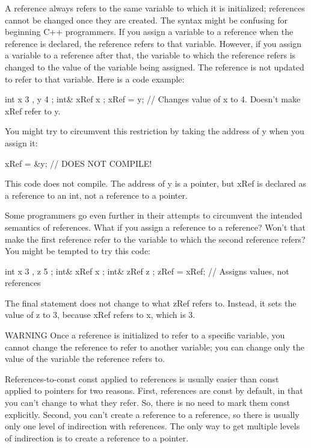 
A reference always refers to the same variable to which it is initialized; references cannot be changed once they are created. The syntax might be confusing for beginning C++ programmers. If you assign a variable to a reference when the reference is declared, the reference refers to that variable. However, if you assign a variable to a reference after that, the variable to which the reference refers is changed to the value of the variable being assigned. The reference is not updated to refer to that variable. Here is a code example:

\begin{cpp}
int x { 3 }, y { 4 };
int& xRef { x };
xRef = y; // Changes value of x to 4. Doesn't make xRef refer to y.
\end{cpp}

You might try to circumvent this restriction by taking the address of y when you assign it:

\begin{cpp}
xRef = &y; // DOES NOT COMPILE!
\end{cpp}

This code does not compile. The address of y is a pointer, but xRef is declared as a reference to an int, not a reference to a pointer.

Some programmers go even further in their attempts to circumvent the intended semantics of references. What if you assign a reference to a reference? Won’t that make the first reference refer to the variable to which the second reference refers? You might be tempted to try this code:

\begin{cpp}
int x { 3 }, z { 5 };
int& xRef { x };
int& zRef { z };
zRef = xRef; // Assigns values, not references
\end{cpp}

The final statement does not change to what zRef refers to. Instead, it sets the value of z to 3, because xRef refers to x, which is 3.

\begin{myWarning}{WARNING}
Once a reference is initialized to refer to a specific variable, you cannot change the reference to refer to another variable; you can change only the value of the variable the reference refers to.
\end{myWarning}

References-to-const
const applied to references is usually easier than const applied to pointers for two reasons. First, references are const by default, in that you can’t change to what they refer. So, there is no need to mark them const explicitly. Second, you can’t create a reference to a reference, so there is usually only one level of indirection with references. The only way to get multiple levels of indirection is to create a reference to a pointer.

